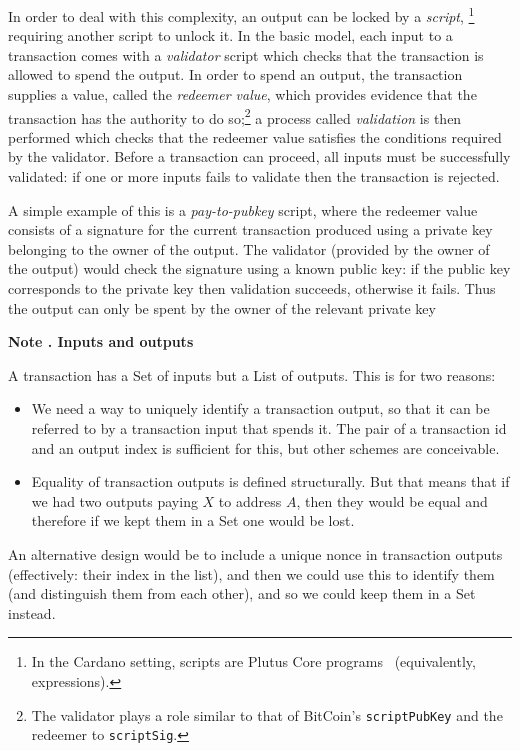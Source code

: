 \documentclass[a4paper]{article}
\newcounter{note}
\newcommand{\note}[1]{
  \bigskip
  \refstepcounter{note}
  \noindent\textbf{Note \thenote. #1}
}
\renewcommand{\i}{\textit}  %
\newcommand{\s}{\textsf}  %
\begin{document}
In order to deal with this complexity, an output can be locked by a
\textit{script},%
\footnote{In the Cardano setting, scripts are Plutus Core
  programs~\citep{Plutus-Core-spec} (equivalently, expressions).  }
requiring another script to unlock it.  In the basic model, each input
to a transaction comes with a \i{validator} script which checks that
the transaction is allowed to spend the output. In order to spend an
output, the transaction supplies a value, called the
\i{redeemer value}, which provides evidence that the transaction has the
authority to do so;\footnote{The validator plays a role similar to
  that of BitCoin's \texttt{scriptPubKey} and the redeemer to
  \texttt{scriptSig}.  } a process called \i{validation} is then
performed which checks that the redeemer value satisfies the conditions
required by the validator. Before a transaction can proceed, all inputs
must be successfully validated: if one or more inputs fails to
validate then the transaction is rejected.

A simple example of this is a \i{pay-to-pubkey} script, where the
redeemer value consists of a signature for the current transaction produced
using a private key belonging to the owner of the output.  The
validator (provided by the owner of the output) would check the
signature using a known public key: if the public key corresponds to
the private key then validation succeeds, otherwise it fails.  Thus
the output can only be spent by the owner of the relevant private key

\note{Inputs and outputs}
\label{note:inputs-and-outputs}
A transaction has a \textsf{Set} of inputs but a \textsf{List} of outputs.
This is for two reasons:
\begin{itemize}
  \item We need a way to uniquely identify a transaction output, so
  that it can be referred to by a transaction input that spends it. The pair of
  a transaction id and an output index is sufficient for this, but other schemes
  are conceivable.
  \item Equality of transaction outputs is defined structurally. But that means
    that if we had two outputs paying $X$ to address $A$, then they would be
    equal and therefore if we kept them in a \s{Set} one would be lost.
\end{itemize}

An alternative design would be to include a unique nonce in transaction outputs
(effectively: their index in the list), and then we could use this to identify
them (and distinguish them from each other), and so we could keep them in a \s{Set} instead.
\end{document}
